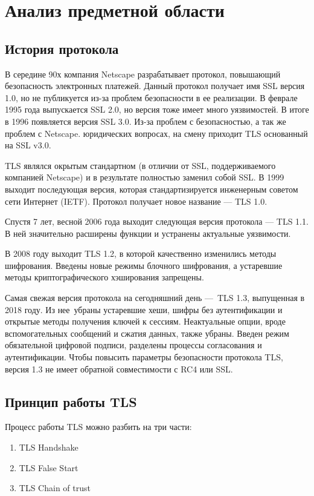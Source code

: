 \chapter{Анализ предметной области}\label{Analis}

\section{История протокола}\label{actualnost}

В середине 90х компания Netscape разрабатывает протокол, повышающий безопасность электронных платежей. Данный протокол получает имя SSL версия 1.0, но не публикуется из-за проблем безопасности в ее реализации. В феврале 1995 года выпускается SSL 2.0, но версия тоже имеет много уязвимостей. В итоге в 1996 появляется версия SSL 3.0.
Из-за проблем с безопасностью, а так же проблем с Netscape. юридических  вопросах, на смену приходит TLS основанный на SSL v3.0.

TLS являлся окрытым стандартном (в отличии от SSL, поддерживаемого компанией Netscape) и в результате полностью заменил собой SSL.
В 1999 выходит последующая версия, которая стандартизируется инженерным советом сети Интернет (IETF). Протокол получает новое название — TLS 1.0. 

Спустя 7 лет, весной 2006 года выходит следующая версия протокола — TLS 1.1. В ней значительно расширены функции и устранены актуальные уязвимости. 

В 2008 году выходит TLS 1.2, в которой качественно изменились методы шифрования. Введены новые режимы блочного шифрования, а устаревшие методы криптографического хэширования запрещены. 

Самая свежая версия протокола на сегодняшний день — TLS 1.3, выпущенная в 2018 году. Из нее убраны устаревшие хеши, шифры без аутентификации и открытые методы получения ключей к сессиям. Неактуальные опции, вроде вспомогательных сообщений и сжатия данных, также убраны. Введен режим обязательной цифровой подписи, разделены процессы согласования и аутентификации. Чтобы повысить параметры безопасности протокола TLS, версия 1.3 не имеет обратной совместимости с RC4 или SSL.


\section{Принцип работы TLS}

Процесс работы TLS можно разбить на три части:

\begin{enumerate}
	\item TLS Handshake
	\item TLS False Start
	\item TLS Chain of trust
\end{enumerate}


